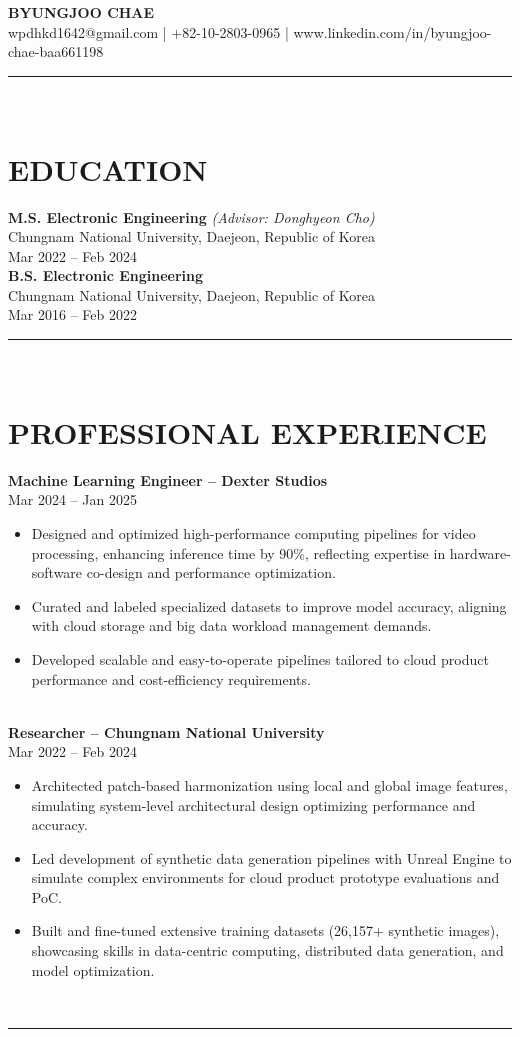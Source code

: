 \documentclass{article}%
\begin{document}
%
\normalsize%
\textbf{BYUNGJOO CHAE}%
\\%
wpdhkd1642@gmail.com | +82{-}10{-}2803{-}0965 | www.linkedin.com/in/byungjoo{-}chae{-}baa661198%
\\[1em]%
\hrule%
\\[1em]%
\section*{EDUCATION}%
\label{sec:EDUCATION}%
\textbf{M.S. Electronic Engineering }\textit{(Advisor: Donghyeon Cho)}%
\\%
Chungnam National University, Daejeon, Republic of Korea%
\\%
Mar 2022 – Feb 2024%
\\[0.5em]%
\textbf{B.S. Electronic Engineering}%
\\%
Chungnam National University, Daejeon, Republic of Korea%
\\%
Mar 2016 – Feb 2022%
\\[1em]%
\hrule%
\\[1em]

%
\section*{PROFESSIONAL EXPERIENCE}%
\label{sec:PROFESSIONALEXPERIENCE}%
\textbf{Machine Learning Engineer – Dexter Studios}%
\\%
Mar 2024 – Jan 2025%
\begin{itemize}%
\item%
Designed and optimized high{-}performance computing pipelines for video processing, enhancing inference time by 90\%, reflecting expertise in hardware{-}software co{-}design and performance optimization.%
\item%
Curated and labeled specialized datasets to improve model accuracy, aligning with cloud storage and big data workload management demands.%
\item%
Developed scalable and easy{-}to{-}operate pipelines tailored to cloud product performance and cost{-}efficiency requirements.%
\end{itemize}%
\\%
\textbf{Researcher – Chungnam National University}%
\\%
Mar 2022 – Feb 2024%
\begin{itemize}%
\item%
Architected patch{-}based harmonization using local and global image features, simulating system{-}level architectural design optimizing performance and accuracy.%
\item%
Led development of synthetic data generation pipelines with Unreal Engine to simulate complex environments for cloud product prototype evaluations and PoC.%
\item%
Built and fine{-}tuned extensive training datasets (26,157+ synthetic images), showcasing skills in data{-}centric computing, distributed data generation, and model optimization.%
\end{itemize}%
\\[1em]%
\hrule%
\\[1em]
\end{document}
